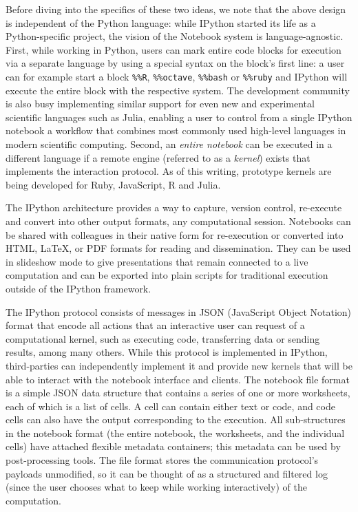 \documentclass[ChapterTOCs,krantz2]{krantz} %
\begin{document}
Before diving into the specifics of these two ideas, we note that the above
design is independent of the Python language: while IPython started its life as
a Python-specific project, the vision of the Notebook system is
language-agnostic.  First, while working in Python, users can mark entire code
blocks for execution via a separate language by using a special syntax on the
block's first line: a user can for example start a block \texttt{\%\%R},
\texttt{\%\%octave}, \texttt{\%\%bash} or \texttt{\%\%ruby} and IPython will
execute the entire block with the respective system.  The development community
is also busy implementing similar support for even new and experimental
scientific languages such as Julia, enabling a user to control from a single
IPython notebook a workflow that combines most commonly used high-level
languages in modern scientific computing.  Second, an \emph{entire notebook}
can be executed in a different language if a remote engine (referred to as a
\emph{kernel}) exists that implements the interaction protocol.  As of this
writing, prototype kernels are being developed for Ruby, JavaScript, R and
Julia.

The IPython architecture provides a way to capture, version control, re-execute
and convert into other output formats, any computational session.  Notebooks
can be shared with colleagues in their native form for re-execution or
converted into HTML, \LaTeX{}, or PDF formats for reading and dissemination.  They
can be used in slideshow mode to give presentations that remain connected to a
live computation and can be exported into plain scripts for traditional
execution outside of the IPython framework.

The IPython protocol consists of messages in JSON (JavaScript Object Notation)
format that encode all actions that an interactive user can request of a
computational kernel, such as executing code, transferring data or sending
results, among many others.  While this protocol is implemented in IPython,
third-parties can independently implement it and provide new kernels that will
be able to interact with the notebook interface and clients.  The notebook file
format is a simple JSON data structure that contains a series of one or more
worksheets, each of which is a list of cells.  A cell can contain either
text or code, and code cells can also have the output corresponding to the
execution.  All sub-structures in the notebook format (the entire notebook, the
worksheets, and the individual cells) have attached flexible metadata
containers; this metadata can be used by post-processing tools.  The file
format stores the communication protocol's payloads unmodified, so it can be
thought of as a structured and filtered log (since the user chooses what to
keep while working interactively) of the computation.  
\end{document}
